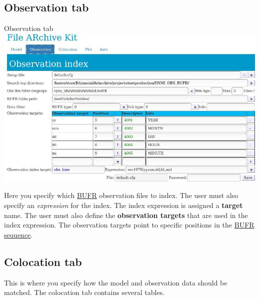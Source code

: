 \documentclass[letterpaper,10pt,twoside,twocolumn,openany]{book}
\begin{document}
\subsection{Observation tab}
\begin{paperbox}{Observation tab}
  \includegraphics[width=\columnwidth]{fark_obs.jpg}
\end{paperbox}
Here you specify which \hyperlink{bufr}{BUFR} observation files to index.
The user must also specify an {\em expression} for the index.
The index expression is assigned a {\bf target} name. 
The user must also define the {\bf observation targets} that are used in the index expression. 
The observation targets point to specific positions in the \hyperlink{sequence}{BUFR sequence}.

\subsection{Colocation tab}
This is where you specify how the model and 
observation data should be matched.
The colocation tab contains several tables.
\end{document}
